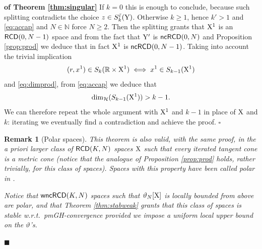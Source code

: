 \documentclass[reqno,11pt]{article}
\numberwithin{equation}{section}
\newcommand{\N}{\mathbb{N}}
\newcommand{\R}{\mathbb{R}}
\newcommand{\eps}{\varepsilon}
\newcommand{\fr}{\penalty-20\null\hfill$\blacksquare$}                      %
\newenvironment{proofb}{\removelastskip\par\medskip   %
\noindent{\em{\bf Proof}} \rm}{\penalty-20\null\hfill$\square$\par\medbreak}
\newtheorem{remark}[theorem]{Remark}
\newcommand{\X}{{\rm X}}
\newcommand{\Y}{{\rm Y}}
\newcommand{\RCD}{{\sf RCD}}
\newcommand{\ncRCD}{{\sf ncRCD}}
\newcommand{\wncRCD}{{\sf wncRCD}}
\newcommand{\HH}{{\mathcal H}}
\begin{document}
\begin{proofb}{\bf  of Theorem \ref{thm:singular}}
If $k=0$ this is enough to  conclude, because such splitting contradicts the choice $z\in S^{\bar\eps}_k(\Y)$. Otherwise $k\geq 1$, hence $k'>1$ and \eqref{eq:accap} and $N\in\N$ force $N\geq 2$. Then the splitting grants that $\X^1$ is an $\RCD(0,N-1)$ space and from the fact that $\Y'$ is $\ncRCD(0,N)$ and Proposition \ref{prop:prod} we  deduce that  in fact $\X^1$ is $\ncRCD(0,N-1)$. Taking into account the trivial implication
\[
(r,x^1)\in S_k(\R\times \X^1) \iff x^1\in S_{k-1}(\X^1)
\]
and \eqref{eq:dimprod}, from \eqref{eq:accap} we deduce that
\[
\dim_{\HH}(S_{k-1}(\X^1))>k-1.
\]
We can therefore repeat the whole argument with $\X^1$ and $k-1$ in place of $\X$ and $k$: iterating we eventually find a contradiction and achieve the proof.
\end{proofb}


\begin{remark}[Polar spaces]{\rm This theorem is also valid, with the same proof, in the a priori larger class of $\RCD(K,N)$ spaces $\X$ such that every iterated tangent cone is a metric cone (notice that the analogue of Proposition \ref{prop:prod} holds, rather trivially, for this class of spaces). Spaces with this property have been called \emph{polar} in \cite{Cheeger-Colding97I}.

Notice that  $\wncRCD(K,N)$ spaces such that $\vartheta_N[\X]$ is locally bounded from above are polar, and that Theorem \ref{thm:stabweak} grants that this class of spaces is stable w.r.t.\ pmGH-convergence provided we impose a uniform local upper bound on the $\vartheta$'s. 
}\fr\end{remark}
\end{document}
